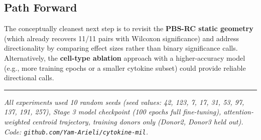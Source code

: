 \documentclass[11pt,a4paper]{article}
\begin{document}
\subsection{Path Forward}

The conceptually cleanest next step is to revisit the \textbf{PBS-RC static
geometry} (which already recovers 11/11 pairs with Wilcoxon significance) and
address directionality by comparing effect sizes rather than binary significance
calls. Alternatively, the \textbf{cell-type ablation} approach with a
higher-accuracy model (e.g., more training epochs or a smaller cytokine subset)
could provide reliable directional calls.

\vspace{2em}
\hrule
\vspace{0.5em}
\small
\textit{All experiments used 10 random seeds (seed values: 42, 123, 7, 17, 31,
53, 97, 137, 191, 257), Stage 3 model checkpoint (100 epochs full fine-tuning),
attention-weighted centroid trajectory, training donors only (Donor2, Donor3
held out). Code: \texttt{github.com/Yam-Arieli/cytokine-mil}.}
\end{document}
